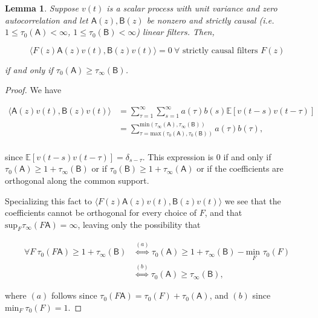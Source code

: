 \documentclass{statsoc}
\newcounter{lemma}
\def\B{\mathsf{B}}  %
\def\A{\mathsf{A}}  %
\newtheorem{lemma}{Lemma}
\def\E{\mathbb{E}}  %
\newcommand{\inner}[2]{\langle #1, #2 \rangle}  %
\begin{document}
\begin{lemma}
  \label{lem:time_lag_cancellation}
  Suppose $v(t)$ is a scalar process with unit variance and zero
  autocorrelation and let $\A(z), \B(z)$ be nonzero and strictly
  causal (i.e. $1 \le \tau_0(\A) < \infty$,
  $1 \le \tau_0(\B) < \infty$) linear filters.  Then,

  \begin{equation}
    \inner{F(z)\A(z)v(t)}{\B(z)v(t)} = 0\ \forall \text{ strictly causal filters } F(z)
  \end{equation}

  if and only if $\tau_0(\A) \ge \tau_\infty(\B)$.
\end{lemma}
\begin{proof}
  We have

  \begin{align}
    \inner{\A(z)v(t)}{\B(z)v(t)} &= \sum_{\tau = 1}^\infty \sum_{s = 1}^\infty a(\tau)b(s)\E[v(t - s)v(t - \tau)]\\
    &= \sum_{\tau = \text{max}(\tau_0(\A), \tau_0(\B))}^{\text{min}(\tau_\infty(\A), \tau_\infty(\B))} a(\tau) b(\tau),\\
  \end{align}

  since $\E[v(t - s)v(t - \tau)] = \delta_{s - \tau}$.  This expression is
  $0$ if and only if $\tau_0(\A) \ge 1 + \tau_\infty(\B)$ or if
  $\tau_0(\B) \ge 1 + \tau_\infty(\A)$ or if the coefficients are orthogonal along
  the common support.

  Specializing this fact to $\inner{F(z)\A(z)v(t)}{\B(z)v(t)}$ we
  see that the coefficients cannot be orthogonal for every choice of
  $F$, and that $\text{sup}_F \tau_\infty(F\A) = \infty$, leaving only
  the possibility that

  \begin{align*}
     \forall F\ \tau_0(F\A) \ge 1 + \tau_\infty(\B) &\overset{(a)}{\iff} \tau_0(\A) \ge 1 + \tau_\infty(\B) - \underset{F}{\text{min }} \tau_0(F)\\
    &\overset{(b)}{\iff} \tau_0(\A) \ge \tau_\infty(\B),
  \end{align*}

  where $(a)$ follows since $\tau_0(F\A) = \tau_0(F) + \tau_0(\A)$,
  and $(b)$ since $\text{min}_F\ \tau_0(F) = 1$.
\end{proof}
\end{document}
